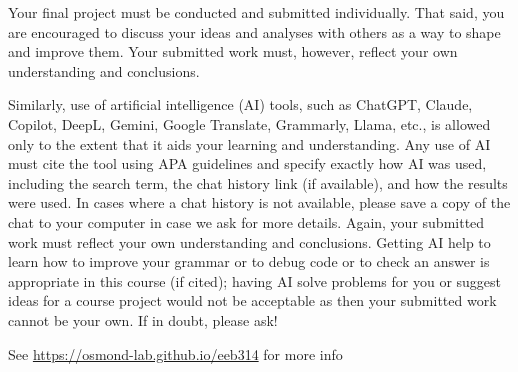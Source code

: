 \documentclass[
]{article}
\begin{document}
\begin{tcolorbox}[breakable,colback=red!8,colframe=red!65!black,title=AI policy,fonttitle=\bfseries]
Your final project must be conducted and submitted individually. That
said, you are encouraged to discuss your ideas and analyses with others
as a way to shape and improve them. Your submitted work must, however,
reflect your own understanding and conclusions.

Similarly, use of artificial intelligence (AI) tools, such as ChatGPT,
Claude, Copilot, DeepL, Gemini, Google Translate, Grammarly, Llama,
etc., is allowed only to the extent that it aids your learning and
understanding. Any use of AI must cite the tool using APA guidelines and
specify exactly how AI was used, including the search term, the chat
history link (if available), and how the results were used. In cases
where a chat history is not available, please save a copy of the chat to
your computer in case we ask for more details. Again, your submitted
work must reflect your own understanding and conclusions. Getting AI
help to learn how to improve your grammar or to debug code or to check
an answer is appropriate in this course (if cited); having AI solve
problems for you or suggest ideas for a course project would not be
acceptable as then your submitted work cannot be your own. If in doubt,
please ask!\end{tcolorbox}

\clearpage
\vspace*{\fill}
\begin{center}
\Large See \url{https://osmond-lab.github.io/eeb314} for more info
\end{center}
\vspace*{\fill}
\end{document}
